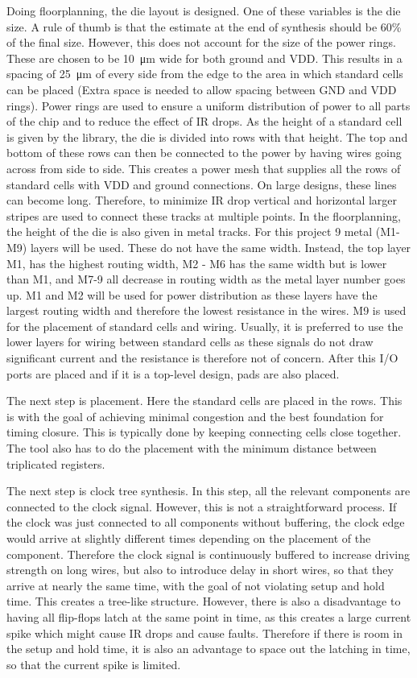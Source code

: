 Doing floorplanning, the die layout is designed. One of these variables is the die size. A rule of thumb is that the estimate at the end of synthesis should be 60\% of the final size. However, this does not account for the size of the power rings. These are chosen to be \SI{10}{\um} wide for both ground and VDD. This results in a spacing of \SI{25}{\um} of every side from the edge to the area in which standard cells can be placed (Extra space is needed to allow spacing between GND and VDD rings). Power rings are used to ensure a uniform distribution of power to all parts of the chip and to reduce the effect of IR drops. As the height of a standard cell is given by the library, the die is divided into rows with that height. The top and bottom of these rows can then be connected to the power by having wires going across from side to side. This creates a power mesh that supplies all the rows of standard cells with VDD and ground connections. On large designs, these lines can become long. Therefore, to minimize IR drop vertical and horizontal larger stripes are used to connect these tracks at multiple points. In the floorplanning, the height of the die is also given in metal tracks. For this project 9 metal (M1-M9) layers will be used. These do not have the same width. Instead, the top layer M1, has the highest routing width, M2 - M6 has the same width but is lower than M1, and M7-9 all decrease in routing width as the metal layer number goes up. M1 and M2 will be used for power distribution as these layers have the largest routing width and therefore the lowest resistance in the wires. M9 is used for the placement of standard cells and wiring. Usually, it is preferred to use the lower layers for wiring between standard cells as these signals do not draw significant current and the resistance is therefore not of concern. After this I/O ports are placed and if it is a top-level design, pads are also placed. 

The next step is placement. Here the standard cells are placed in the rows. This is with the goal of achieving minimal congestion and the best foundation for timing closure. This is typically done by keeping connecting cells close together. The tool also has to do the placement with the minimum distance between triplicated registers. 

The next step is clock tree synthesis. In this step, all the relevant components are connected to the clock signal. However, this is not a straightforward process. If the clock was just connected to all components without buffering, the clock edge would arrive at slightly different times depending on the placement of the component. Therefore the clock signal is continuously buffered to increase driving strength on long wires, but also to introduce delay in short wires, so that they arrive at nearly the same time, with the goal of not violating setup and hold time. This creates a tree-like structure. However, there is also a disadvantage to having all flip-flops latch at the same point in time, as this creates a large current spike which might cause IR drops and cause faults. Therefore if there is room in the setup and hold time, it is also an advantage to space out the latching in time, so that the current spike is limited. 

